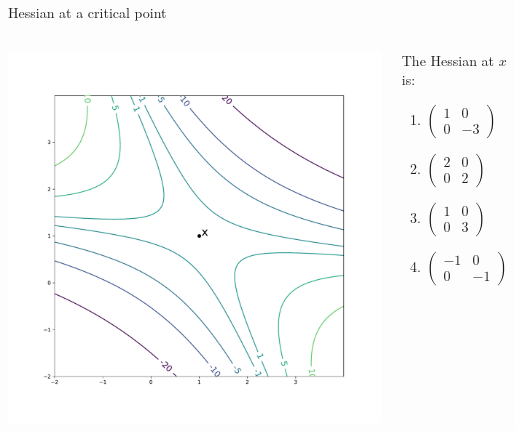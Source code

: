 \documentclass{beamer}
\begin{document}
\begin{frame}[t]{Hessian at a critical point}

	\vspace{-1.6cm}
	\begin{columns}
		\begin{column}{0.7\textwidth}
			\hspace*{-1.7cm}
			\includegraphics[width=11.0cm]{contour_saddle.pdf}
		\end{column}
		\hspace*{0.2cm}
		\begin{column}{0.29\textwidth}
			The Hessian at $x$ is:
			\begin{enumerate}
				\item $\displaystyle
					\begin{pmatrix}
						1 & 0 \\
						0 & -3
					\end{pmatrix}$
				\item $\displaystyle
					\begin{pmatrix}
						2 & 0 \\
						0 & 2
					\end{pmatrix}$
				\item $\displaystyle
					\begin{pmatrix}
						1 & 0 \\
						0 & 3
					\end{pmatrix}$
				\item $\displaystyle
					\begin{pmatrix}
						-1 & 0 \\
						0 & -1
					\end{pmatrix}$
			\end{enumerate}
		\end{column}
	\end{columns}

\end{frame}
\end{document}
